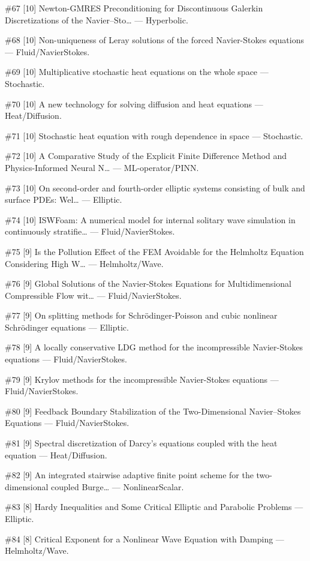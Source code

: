 \documentclass[10pt,letterpaper]{article}
\begin{document}
\#67 [10] Newton-GMRES Preconditioning for Discontinuous Galerkin Discretizations of the Navier--Sto… — Hyperbolic.

\#68 [10] Non-uniqueness of Leray solutions of the forced Navier-Stokes equations — Fluid/NavierStokes.

\#69 [10] Multiplicative stochastic heat equations on the whole space — Stochastic.

\#70 [10] A new technology for solving diffusion and heat equations — Heat/Diffusion.

\#71 [10] Stochastic heat equation with rough dependence in space — Stochastic.

\#72 [10] A Comparative Study of the Explicit Finite Difference Method and Physics-Informed Neural N… — ML-operator/PINN.

\#73 [10] On second-order and fourth-order elliptic systems consisting of bulk and surface PDEs: Wel… — Elliptic.

\#74 [10] ISWFoam: A numerical model for internal solitary wave simulation in continuously stratifie… — Fluid/NavierStokes.

\#75 [9] Is the Pollution Effect of the FEM Avoidable for the Helmholtz Equation Considering High W… — Helmholtz/Wave.

\#76 [9] Global Solutions of the Navier-Stokes Equations for Multidimensional Compressible Flow wit… — Fluid/NavierStokes.

\#77 [9] On splitting methods for Schrödinger-Poisson and cubic nonlinear Schrödinger equations — Elliptic.

\#78 [9] A locally conservative LDG method for the incompressible Navier-Stokes equations — Fluid/NavierStokes.

\#79 [9] Krylov methods for the incompressible Navier-Stokes equations — Fluid/NavierStokes.

\#80 [9] Feedback Boundary Stabilization of the Two-Dimensional Navier--Stokes Equations — Fluid/NavierStokes.

\#81 [9] Spectral discretization of Darcy's equations coupled with the heat equation — Heat/Diffusion.

\#82 [9] An integrated stairwise adaptive finite point scheme for the two-dimensional coupled Burge… — NonlinearScalar.

\#83 [8] Hardy Inequalities and Some Critical Elliptic and Parabolic Problems — Elliptic.

\#84 [8] Critical Exponent for a Nonlinear Wave Equation with Damping — Helmholtz/Wave.
\end{document}
